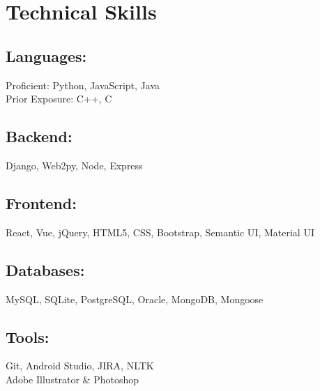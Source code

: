 \documentclass[]{hieudo-build}
\begin{document}
\begin{minipage}[t]{0.3\textwidth} 

\section{Technical Skills}
\begin{flushleft}
\narrower
\subsection{Languages:}
\normalsize
  Proficient: Python, JavaScript, Java
  \smallskip \\
  Prior Exposure: C++, C

\subsection{Backend:}
\normalsize
  Django, Web2py, Node, Express

\subsection{Frontend:}
\normalsize
  React, Vue,
  jQuery, HTML5, CSS, Bootstrap, Semantic UI, Material UI

\subsection{Databases:}
\normalsize
  MySQL, SQLite, PostgreSQL, Oracle, MongoDB, Mongoose

\subsection{Tools:}
\normalsize
  Git, Android Studio, JIRA, NLTK \\
  Adobe Illustrator \& Photoshop
\end{flushleft}
\sectionsep



\end{minipage}
\end{document}
